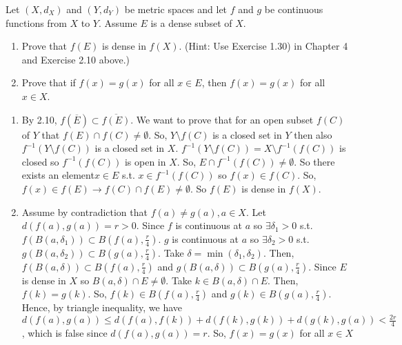 \documentclass[12pt,letterpaper,boxed]{hmcpset}
\begin{document}
\begin{solution}

\end{solution}

\begin{problem}[Exercise 2.11]
Let $(X, d_X)$ and $(Y, d_Y)$ be metric spaces and let $f$ and $g$ be continuous functions from $X$ to $Y$. Assume $E$ is a dense subset of $X$.
\vspace{-2mm}
\begin{enumerate}
    \itemsep0em
    \item Prove that $f(E)$ is dense in $f(X).$ (Hint: Use Exercise 1.30) in Chapter 4 and Exercise 2.10 above.)
    \item Prove that if $f(x) = g(x)$ for all $x \in E$, then $f(x) = g(x)$ for all $x\in X$.
\end{enumerate} 
\end{problem}

\begin{solution}
\begin{enumerate}
     \itemsep0em
    \item By 2.10, $f(\overline{E})\subset\overline{f(E)}$. We want to prove that for an open subset $f(C)$ of $Y$ that $f(E) \cap f(C)\neq \emptyset$. So, $Y\setminus f(C)$ is a closed set in $Y$ then also $f^{-1}(Y\setminus f(C))$ is a closed set in $X$. $f^{-1}(Y\setminus f(C))=X\setminus f^{-1}(f(C))$ is closed so $f^{-1}(f(C))$ is open in $X$. So, $E\cap f^{-1}(f(C))\neq \emptyset.$ So there exists an element$x\in E$ s.t. $x \in f^{-1}(f(C))$ so $f(x) \in f(C).$ So, $f(x) \in f(E) \rightarrow f(C)\cap f(E)\neq \emptyset$. So $f(E)$ is dense in $f(X).$
    \item Assume by contradiction that $f(a)\neq g(a), a\in X$. Let $d(f(a), g(a)) = r > 0$. Since $f$ is continuous at $a$ so $\exists \delta_1 > 0$ s.t. $f(B(a, \delta_1))\subset B(f(a),\frac{r}{4})$. $g$ is continuous at $a$ so $\exists \delta_2 > 0$ s.t. $g(B(a, \delta_2))\subset B(g(a),\frac{r}{4})$. Take $\delta = \min(\delta_1, \delta_2)$. Then, $f(B(a, \delta))\subset B(f(a),\frac{r}{4})$ and $g(B(a, \delta))\subset B(g(a),\frac{r}{4})$. Since $E$ is dense in $X$ so $B(a, \delta)\cap E \neq \emptyset$. Take $k\in B(a, \delta)\cap E$. Then, $f(k)=g(k).$ So, $f(k)\in B(f(a), \frac{r}{4})$ and $g(k)\in B(g(a), \frac{r}{4})$. Hence, by triangle inequality, we have $d(f(a), g(a)) \leq d(f(a), f(k)) + d(f(k), g(k)) + d(g(k), g(a)) < \frac{2r}{4}$, which is false since $d(f(a), g(a))=r.$ So, $f(x)=g(x)$ for all $x\in X$
\end{enumerate}
\end{solution}
\end{document}
